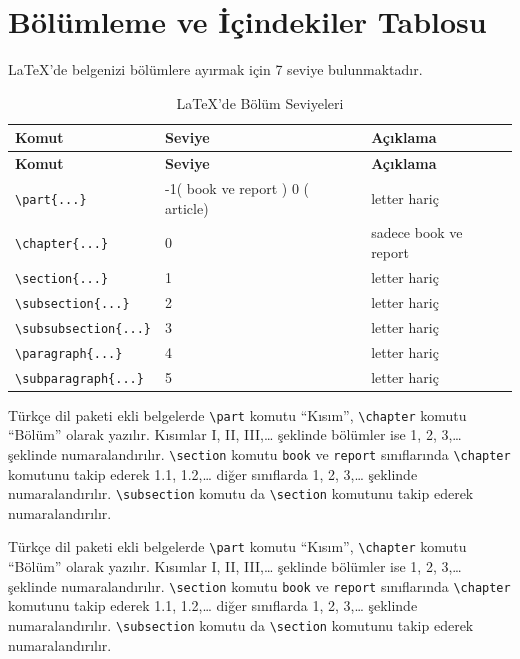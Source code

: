 \documentclass[
  letterpaper,
  DIV=11,
  numbers=noendperiod]{scrreprt}
\begin{document}
\hypertarget{buxf6luxfcmleme-ve-iuxe7indekiler-tablosu}{%
\section{Bölümleme ve İçindekiler
Tablosu}\label{buxf6luxfcmleme-ve-iuxe7indekiler-tablosu}}

{\LaTeX}'de belgenizi bölümlere ayırmak için 7 seviye bulunmaktadır.

\hypertarget{tbl-bolumseviyeleri}{}
\begin{longtable}[]{@{}lll@{}}
\caption{\label{tbl-bolumseviyeleri}{\LaTeX}'de Bölüm
Seviyeleri}\tabularnewline
\toprule()
\textbf{Komut} & \textbf{Seviye} & \textbf{Açıklama} \\
\midrule()
\endfirsthead
\toprule()
\textbf{Komut} & \textbf{Seviye} & \textbf{Açıklama} \\
\midrule()
\endhead
\texttt{\textbackslash{}part\{...\}} & -1( book ve report ) 0 ( article)
& letter hariç \\
\texttt{\textbackslash{}chapter\{...\}} & 0 & sadece book ve report \\
\texttt{\textbackslash{}section\{...\}} & 1 & letter hariç \\
\texttt{\textbackslash{}subsection\{...\}} & 2 & letter hariç \\
\texttt{\textbackslash{}subsubsection\{...\}} & 3 & letter hariç \\
\texttt{\textbackslash{}paragraph\{...\}} & 4 & letter hariç \\
\texttt{\textbackslash{}subparagraph\{...\}} & 5 & letter hariç \\
\bottomrule()
\end{longtable}

Türkçe dil paketi ekli belgelerde \texttt{\textbackslash{}part} komutu
``Kısım'', \texttt{\textbackslash{}chapter} komutu ``Bölüm'' olarak
yazılır. Kısımlar I, II, III,\ldots{} şeklinde bölümler ise 1, 2,
3,\ldots{} şeklinde numaralandırılır. \texttt{\textbackslash{}section}
komutu \texttt{book} ve \texttt{report} sınıflarında
\texttt{\textbackslash{}chapter} komutunu takip ederek 1.1, 1.2,\ldots{}
diğer sınıflarda 1, 2, 3,\ldots{} şeklinde numaralandırılır.
\texttt{\textbackslash{}subsection} komutu da
\texttt{\textbackslash{}section} komutunu takip ederek numaralandırılır.

Türkçe dil paketi ekli belgelerde \texttt{\textbackslash{}part} komutu
``Kısım'', \texttt{\textbackslash{}chapter} komutu ``Bölüm'' olarak
yazılır. Kısımlar I, II, III,\ldots{} şeklinde bölümler ise 1, 2,
3,\ldots{} şeklinde numaralandırılır. \texttt{\textbackslash{}section}
komutu \texttt{book} ve \texttt{report} sınıflarında
\texttt{\textbackslash{}chapter} komutunu takip ederek 1.1, 1.2,\ldots{}
diğer sınıflarda 1, 2, 3,\ldots{} şeklinde numaralandırılır.
\texttt{\textbackslash{}subsection} komutu da
\texttt{\textbackslash{}section} komutunu takip ederek numaralandırılır.
\end{document}

